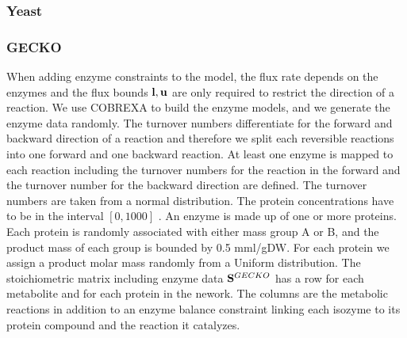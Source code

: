 \subsubsection{Yeast}

\subsubsection{GECKO}
When adding enzyme constraints to the model, the flux rate depends on the enzymes and the flux bounds $\bold l, \bold u$ are only required to restrict the direction of a reaction.  
We use COBREXA to build the enzyme models, and we generate the enzyme data randomly.
The turnover numbers differentiate for the forward and backward direction of a reaction and therefore we split each reversible reactions into one forward and one backward reaction.
At least one enzyme is mapped to each reaction including the turnover numbers for the reaction in the forward and the turnover number for the backward direction are defined. 
The turnover numbers are taken from a normal distribution. %
The protein concentrations have to be in the interval $[0, 1000]$ %
. An enzyme is made up of one or more proteins.
Each protein is randomly associated with either mass group A or B, and the product mass of each group is bounded by 0.5 mml/gDW. For each protein we assign a product molar mass randomly from a Uniform distribution. 
The stoichiometric matrix including enzyme data $\bold S^{GECKO}$ has a row for each metabolite and for each protein in the nework. The columns are the metabolic reactions in addition to an enzyme balance constraint linking each isozyme to its protein compound and the reaction it catalyzes.

